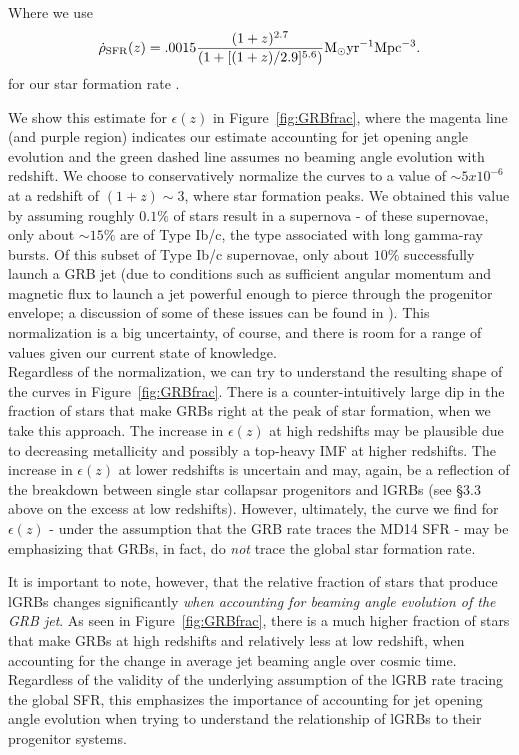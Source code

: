 \documentclass[fleqn,usenatbib,useAMS]{mnras}
\begin{document}
  \noindent Where we use
  \begin{equation}
  \dot{\rho}_{\rm SFR}(z)  = .0015\frac{(1+z)^{2.7}}{(1+[(1+z)/2.9]^{5.6})} \rm M_{\odot} yr^{-1} Mpc^{-3}. 
  \end{equation}
 \noindent for our star formation rate \citep{MD14}.
 
 We show this estimate for $\epsilon(z)$ in Figure~\ref{fig:GRBfrac}, where the magenta line (and purple region) indicates our estimate accounting for jet opening angle evolution and the green dashed line assumes no beaming angle evolution with redshift.  We choose to conservatively normalize the curves to a value of $\sim 5x10^{-6}$ at a redshift of $(1+z) \sim 3$, where star formation peaks.  We obtained this value by assuming roughly $0.1 \%$ of stars result in a supernova - of these supernovae, only about $\sim 15 \%$ \citep{Sm11} are of Type Ib/c, the type associated with long gamma-ray bursts.  Of this subset of Type Ib/c supernovae, only about $10\%$ \citep{Ch07, Kan13} successfully launch a GRB jet (due to conditions such as sufficient angular momentum and magnetic flux to launch a jet powerful enough to pierce through the progenitor envelope; a discussion of some of these issues can be found in \cite{LR19b}). This normalization is a big uncertainty, of course, and there is room for a range of values given our current state of knowledge. \\ 
 
 Regardless of the normalization, we can try to understand the resulting shape of the curves in Figure~\ref{fig:GRBfrac}.  There is a counter-intuitively large dip in the fraction of stars that make GRBs right at the peak of star formation, when we take this approach.  The increase in $\epsilon(z)$ at high redshifts may be plausible due to decreasing metallicity and possibly a top-heavy IMF at higher redshifts.  The increase in $\epsilon(z)$ at lower redshifts is uncertain and may, again, be a reflection of the breakdown between single star collapsar progenitors and lGRBs (see \S 3.3 above on the excess at low redshifts).  However, ultimately, the curve we find for $\epsilon(z)$ - under the assumption that the GRB rate traces the MD14 SFR - may be emphasizing that GRBs, in fact, do {\em not} trace the global star formation rate. 
 
  It is important to note, however, that the relative fraction of stars that produce lGRBs changes significantly {\em when accounting for beaming angle evolution of the GRB jet}.  As seen in Figure~\ref{fig:GRBfrac}, there is a much higher fraction of stars that make GRBs at high redshifts and relatively less at low redshift, when accounting for the change in average jet beaming angle over cosmic time.  Regardless of the validity of the underlying assumption of the lGRB rate tracing the global SFR, this emphasizes the importance of accounting for jet opening angle evolution when trying to understand the relationship of lGRBs to their progenitor systems.
  \\
 
\end{document}
